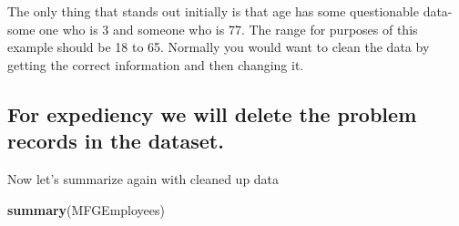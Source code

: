 \documentclass[12pt, krantz2,]{krantz}
\makeatletter
\newenvironment{Shaded}{\begin{snugshade}}{\end{snugshade}}
\newcommand{\DecValTok}[1]{\textcolor[rgb]{0.06,0.06,0.06}{#1}}
\newcommand{\KeywordTok}[1]{\textcolor[rgb]{0.27,0.27,0.27}{\textbf{#1}}}
\newcommand{\NormalTok}[1]{#1}
\newcommand{\OperatorTok}[1]{\textcolor[rgb]{0.43,0.43,0.43}{\textbf{#1}}}
\newcommand{\StringTok}[1]{\textcolor[rgb]{0.5,0.5,0.5}{#1}}
\newenvironment{kframe}{%
\medskip{}
\setlength{\fboxsep}{.8em}
 \def\at@end@of@kframe{}%
 \ifinner\ifhmode%
  \def\at@end@of@kframe{\end{minipage}}%
  \begin{minipage}{\columnwidth}%
 \fi\fi%
 \def\FrameCommand##1{\hskip\@totalleftmargin \hskip-\fboxsep
 \colorbox{shadecolor}{##1}\hskip-\fboxsep
     \hskip-\linewidth \hskip-\@totalleftmargin \hskip\columnwidth}%
 \MakeFramed {\advance\hsize-\width
   \@totalleftmargin\z@ \linewidth\hsize
   \@setminipage}}%
 {\par\unskip\endMakeFramed%
 \at@end@of@kframe}
\renewenvironment{Shaded}{\begin{kframe}}{\end{kframe}}
\makeatother
\begin{document}
The only thing that stands out initially is that age has some questionable data- some one who is 3 and someone who is 77. The range for purposes of this example should be 18 to 65. Normally you would want to clean the data by getting the correct information and then changing it.

\hypertarget{for-expediency-we-will-delete-the-problem-records-in-the-dataset.}{%
\subsection{For expediency we will delete the problem records in the dataset.}\label{for-expediency-we-will-delete-the-problem-records-in-the-dataset.}}

\begin{Shaded}
\end{Shaded}

Now let's summarize again with cleaned up data

\begin{Shaded}
\begin{Highlighting}[]
\KeywordTok{summary}\NormalTok{(MFGEmployees)}
\end{Highlighting}
\end{Shaded}
\end{document}
